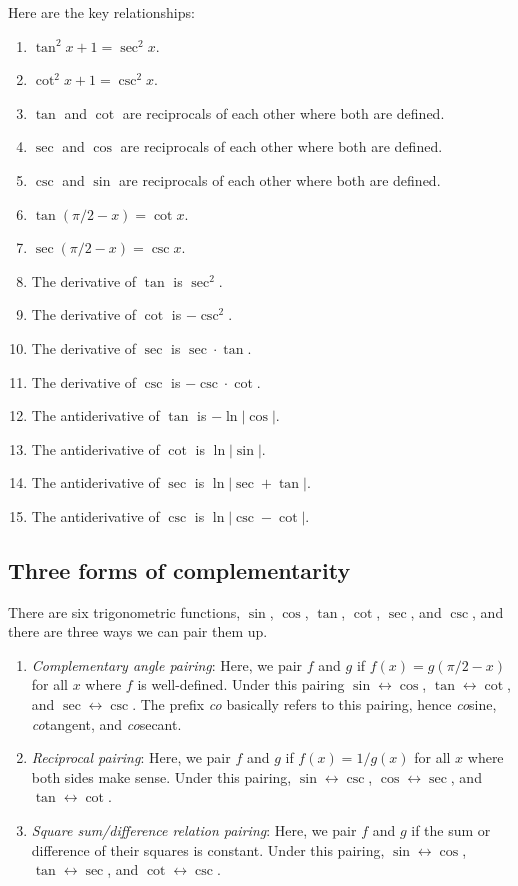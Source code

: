 \documentclass{amsart}
\begin{document}
Here are the key relationships:

\begin{enumerate}
\item $\tan^2 x + 1 = \sec^2 x$.
\item $\cot^2 x + 1 = \csc^2 x$.
\item $\tan$ and $\cot$ are reciprocals of each other where both are defined.
\item $\sec$ and $\cos$ are reciprocals of each other where both are defined.
\item $\csc$ and $\sin$ are reciprocals of each other where both are defined.
\item $\tan(\pi/2 - x) = \cot x$.
\item $\sec(\pi/2 - x) = \csc x$.
\item The derivative of $\tan$ is $\sec^2$.
\item The derivative of $\cot$ is $-\csc^2$.
\item The derivative of $\sec$ is $\sec \cdot \tan$.
\item The derivative of $\csc$ is $-\csc \cdot \cot$.
\item The antiderivative of $\tan$ is $-\ln | \cos |$.
\item The antiderivative of $\cot$ is $\ln | \sin |$.
\item The antiderivative of $\sec$ is $\ln | \sec + \tan |$.
\item The antiderivative of $\csc$ is $\ln | \csc - \cot |$.
\end{enumerate}

\subsection{Three forms of complementarity}

There are six trigonometric functions, $\sin$, $\cos$, $\tan$, $\cot$,
$\sec$, and $\csc$, and there are three ways we can pair them up.

\begin{enumerate}
\item {\em Complementary angle pairing}: Here, we pair $f$ and $g$ if
  $f(x) = g(\pi/2 - x)$ for all $x$ where $f$ is well-defined. Under
  this pairing $\sin \leftrightarrow \cos$, $\tan \leftrightarrow
  \cot$, and $\sec \leftrightarrow \csc$. The prefix {\em co}
  basically refers to this pairing, hence {\em co}sine, {\em
  co}tangent, and {\em co}secant.
\item {\em Reciprocal pairing}: Here, we pair $f$ and $g$ if $f(x) =
  1/g(x)$ for all $x$ where both sides make sense. Under this pairing,
  $\sin \leftrightarrow \csc$, $\cos \leftrightarrow \sec$, and $\tan
  \leftrightarrow \cot$.
\item {\em Square sum/difference relation pairing}: Here, we pair $f$
  and $g$ if the sum or difference of their squares is constant. Under
  this pairing, $\sin \leftrightarrow \cos$, $\tan \leftrightarrow
  \sec$, and $\cot \leftrightarrow \csc$.
\end{enumerate}
\end{document}
